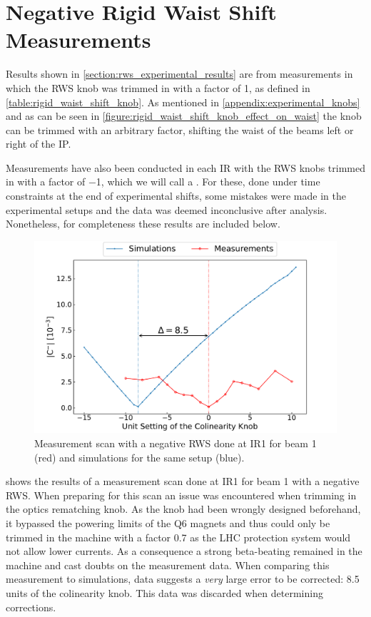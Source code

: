 \chapter{Negative Rigid Waist Shift Measurements}
\label{appendix:inconclusive_measurements}

Results shown in \cref{section:rws_experimental_results} are from measurements in which the \gls{RWS} \gls{knob} was trimmed in with a factor of \num{1}, as defined in \cref{table:rigid_waist_shift_knob}.
As mentioned in \cref{appendix:experimental_knobs} and as can be seen in \cref{figure:rigid_waist_shift_knob_effect_on_waist} the knob can be trimmed with an arbitrary factor, shifting the waist of the beams left or right of the \gls{IP}. 

Measurements have also been conducted in each \gls{IR} with the \gls{RWS} knobs trimmed in with a factor of \num{-1}, which we will call a .
For these, done under time constraints at the end of experimental shifts, some mistakes were made in the experimental setups and the data was deemed inconclusive after analysis.
Nonetheless, for completeness these results are included below.

\begin{figure}[!htb]
    \centering
    \includegraphics*[width=\textwidth]{Figures/Appendices/rws_measurement_ir1_b1_neg.pdf}
    \caption{Measurement scan with a negative RWS done at IR\num{1} for beam \num{1} (\textcolor{mplr}{red}) and simulations for the same setup (\textcolor{mplblue}{blue}).}
    \label{figure:ir1_b1_neg_measurement}
\end{figure}

 shows the results of a measurement scan done at IR\num{1} for beam \num{1} with a negative RWS.
When preparing for this scan an issue was encountered when trimming in the \gls{optics} rematching knob.
As the knob had been wrongly designed beforehand, it bypassed the powering limits of the Q\num{6} magnets and thus could only be trimmed in the machine with a factor \num{0.7} as the LHC protection system would not allow lower currents.
As a consequence a strong \gls{beta-beating} remained in the machine and cast doubts on the measurement data. 
When comparing this measurement to simulations, data suggests a \textit{very} large error to be corrected: \num{8.5} units of the colinearity knob.
This data was discarded when determining corrections.

